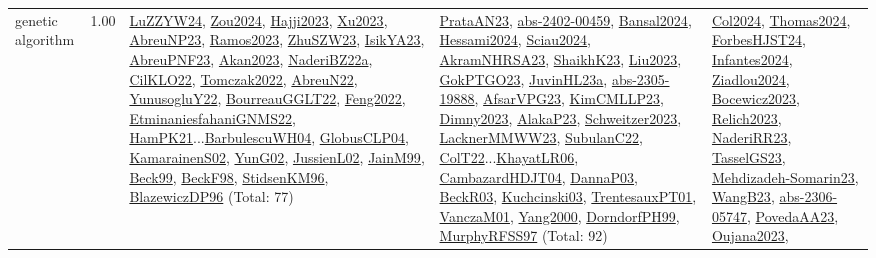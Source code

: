 {\begin{longtable}{p{3cm}r>{\raggedright\arraybackslash}p{6cm}>{\raggedright\arraybackslash}p{6cm}>{\raggedright\arraybackslash}p{8cm}}
\index{genetic algorithm}\index{Algorithms!genetic algorithm}genetic algorithm &  1.00 & \hyperref[detail:LuZZYW24]{LuZZYW24}, \hyperref[detail:Zou2024]{Zou2024}, \hyperref[detail:Hajji2023]{Hajji2023}, \hyperref[detail:Xu2023]{Xu2023}, \hyperref[detail:AbreuNP23]{AbreuNP23}, \hyperref[detail:Ramos2023]{Ramos2023}, \hyperref[detail:ZhuSZW23]{ZhuSZW23}, \hyperref[detail:IsikYA23]{IsikYA23}, \hyperref[detail:AbreuPNF23]{AbreuPNF23}, \hyperref[detail:Akan2023]{Akan2023}, \hyperref[detail:NaderiBZ22a]{NaderiBZ22a}, \hyperref[detail:CilKLO22]{CilKLO22}, \hyperref[detail:Tomczak2022]{Tomczak2022}, \hyperref[detail:AbreuN22]{AbreuN22}, \hyperref[detail:YunusogluY22]{YunusogluY22}, \hyperref[detail:BourreauGGLT22]{BourreauGGLT22}, \hyperref[detail:Feng2022]{Feng2022}, \hyperref[detail:EtminaniesfahaniGNMS22]{EtminaniesfahaniGNMS22}, \hyperref[detail:HamPK21]{HamPK21}...\hyperref[detail:BarbulescuWH04]{BarbulescuWH04}, \hyperref[detail:GlobusCLP04]{GlobusCLP04}, \hyperref[detail:KamarainenS02]{KamarainenS02}, \hyperref[detail:YunG02]{YunG02}, \hyperref[detail:JussienL02]{JussienL02}, \hyperref[detail:JainM99]{JainM99}, \hyperref[detail:Beck99]{Beck99}, \hyperref[detail:BeckF98]{BeckF98}, \hyperref[detail:StidsenKM96]{StidsenKM96}, \hyperref[detail:BlazewiczDP96]{BlazewiczDP96} (Total: 77) & \hyperref[detail:PrataAN23]{PrataAN23}, \hyperref[detail:abs-2402-00459]{abs-2402-00459}, \hyperref[detail:Bansal2024]{Bansal2024}, \hyperref[detail:Hessami2024]{Hessami2024}, \hyperref[detail:Sciau2024]{Sciau2024}, \hyperref[detail:AkramNHRSA23]{AkramNHRSA23}, \hyperref[detail:ShaikhK23]{ShaikhK23}, \hyperref[detail:Liu2023]{Liu2023}, \hyperref[detail:GokPTGO23]{GokPTGO23}, \hyperref[detail:JuvinHL23a]{JuvinHL23a}, \hyperref[detail:abs-2305-19888]{abs-2305-19888}, \hyperref[detail:AfsarVPG23]{AfsarVPG23}, \hyperref[detail:KimCMLLP23]{KimCMLLP23}, \hyperref[detail:Dimny2023]{Dimny2023}, \hyperref[detail:AlakaP23]{AlakaP23}, \hyperref[detail:Schweitzer2023]{Schweitzer2023}, \hyperref[detail:LacknerMMWW23]{LacknerMMWW23}, \hyperref[detail:SubulanC22]{SubulanC22}, \hyperref[detail:ColT22]{ColT22}...\hyperref[detail:KhayatLR06]{KhayatLR06}, \hyperref[detail:CambazardHDJT04]{CambazardHDJT04}, \hyperref[detail:DannaP03]{DannaP03}, \hyperref[detail:BeckR03]{BeckR03}, \hyperref[detail:Kuchcinski03]{Kuchcinski03}, \hyperref[detail:TrentesauxPT01]{TrentesauxPT01}, \hyperref[detail:VanczaM01]{VanczaM01}, \hyperref[detail:Yang2000]{Yang2000}, \hyperref[detail:DorndorfPH99]{DorndorfPH99}, \hyperref[detail:MurphyRFSS97]{MurphyRFSS97} (Total: 92) & \hyperref[detail:Col2024]{Col2024}, \hyperref[detail:Thomas2024]{Thomas2024}, \hyperref[detail:ForbesHJST24]{ForbesHJST24}, \hyperref[detail:Infantes2024]{Infantes2024}, \hyperref[detail:Ziadlou2024]{Ziadlou2024}, \hyperref[detail:Bocewicz2023]{Bocewicz2023}, \hyperref[detail:Relich2023]{Relich2023}, \hyperref[detail:NaderiRR23]{NaderiRR23}, \hyperref[detail:TasselGS23]{TasselGS23}, \hyperref[detail:Mehdizadeh-Somarin23]{Mehdizadeh-Somarin23}, \hyperref[detail:WangB23]{WangB23}, \hyperref[detail:abs-2306-05747]{abs-2306-05747}, \hyperref[detail:PovedaAA23]{PovedaAA23}, \hyperref[detail:Oujana2023]{Oujana2023}, 
\end{longtable}}

